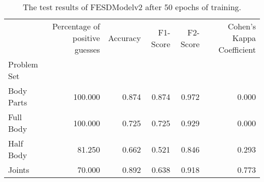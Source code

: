 \begin{table}
      \caption[]{}
      \label{}
          \begin{table}[!htbp]
        \caption[Test Results of FESDModelv2]{The test results of FESDModelv2 after 50 epochs of training.}
        \label{tab:res_v2}
        \begin{tabular}{lrrrrr}
\hline
{} &  Percentage of positive guesses &  Accuracy &  F1-Score &  F2-Score &  Cohen's Kappa Coefficient \\
Problem Set   &                                 &           &           &           &                            \\
\hline
Body Parts &                         100.000 &     0.874 &     0.874 &     0.972 &                      0.000 \\
Full Body  &                         100.000 &     0.725 &     0.725 &     0.929 &                      0.000 \\
Half Body  &                          81.250 &     0.662 &     0.521 &     0.846 &                      0.293 \\
Joints     &                          70.000 &     0.892 &     0.638 &     0.918 &                      0.773 \\
\hline
\end{tabular}

    \end{table}
  \end{table}